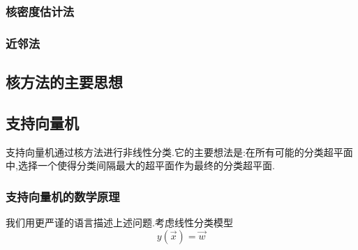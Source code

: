 \documentclass{ctexart}
\begin{document}
\subsubsection{核密度估计法}
\subsubsection{近邻法}
\subsection{核方法的主要思想}
\subsection{支持向量机}
支持向量机通过核方法进行非线性分类.它的主要想法是:在所有可能的分类超平面中,选择一个使得分类间隔最大的超平面作为最终的分类超平面.
\subsubsection{支持向量机的数学原理}
我们用更严谨的语言描述上述问题.考虑线性分类模型
\[y(\vec{x})=\vec{w}^{}\]
\end{document}
